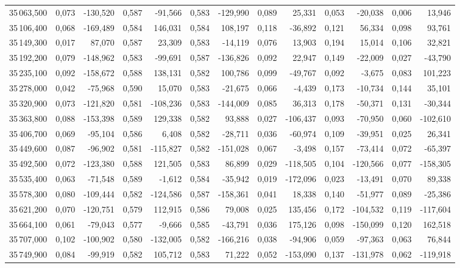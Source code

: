 \begin{longtable}{rrrrrrrrrrrrr}
35\,063,500 & 0,073 & -130,520 & 0,587 & -91,566 & 0,583 & -129,990 & 0,089 & 25,331 & 0,053 & -20,038 & 0,006 & 13,946\\
35\,106,400 & 0,068 & -169,489 & 0,584 & 146,031 & 0,584 & 108,197 & 0,118 & -36,892 & 0,121 & 56,334 & 0,098 & 93,761\\
35\,149,300 & 0,017 & 87,070 & 0,587 & 23,309 & 0,583 & -14,119 & 0,076 & 13,903 & 0,194 & 15,014 & 0,106 & 32,821\\
35\,192,200 & 0,079 & -148,962 & 0,583 & -99,691 & 0,587 & -136,826 & 0,092 & 22,947 & 0,149 & -22,009 & 0,027 & -43,790\\
35\,235,100 & 0,092 & -158,672 & 0,588 & 138,131 & 0,582 & 100,786 & 0,099 & -49,767 & 0,092 & -3,675 & 0,083 & 101,223\\
35\,278,000 & 0,042 & -75,968 & 0,590 & 15,070 & 0,583 & -21,675 & 0,066 & -4,439 & 0,173 & -10,734 & 0,144 & 35,101\\
35\,320,900 & 0,073 & -121,820 & 0,581 & -108,236 & 0,583 & -144,009 & 0,085 & 36,313 & 0,178 & -50,371 & 0,131 & -30,344\\
35\,363,800 & 0,088 & -153,398 & 0,589 & 129,338 & 0,582 & 93,888 & 0,027 & -106,437 & 0,093 & -70,950 & 0,060 & -102,610\\
35\,406,700 & 0,069 & -95,104 & 0,586 & 6,408 & 0,582 & -28,711 & 0,036 & -60,974 & 0,109 & -39,951 & 0,025 & 26,341\\
35\,449,600 & 0,087 & -96,902 & 0,581 & -115,827 & 0,582 & -151,028 & 0,067 & -3,498 & 0,157 & -73,414 & 0,072 & -65,397\\
35\,492,500 & 0,072 & -123,380 & 0,588 & 121,505 & 0,583 & 86,899 & 0,029 & -118,505 & 0,104 & -120,566 & 0,077 & -158,305\\
35\,535,400 & 0,063 & -71,548 & 0,589 & -1,612 & 0,584 & -35,942 & 0,019 & -172,096 & 0,023 & -13,491 & 0,070 & 89,338\\
35\,578,300 & 0,080 & -109,444 & 0,582 & -124,586 & 0,587 & -158,361 & 0,041 & 18,338 & 0,140 & -51,977 & 0,089 & -25,386\\
35\,621,200 & 0,070 & -120,751 & 0,579 & 112,915 & 0,586 & 79,008 & 0,025 & 135,456 & 0,172 & -104,532 & 0,119 & -117,604\\
35\,664,100 & 0,061 & -79,043 & 0,577 & -9,666 & 0,585 & -43,791 & 0,036 & 175,126 & 0,098 & -150,099 & 0,120 & 162,518\\
35\,707,000 & 0,102 & -100,902 & 0,580 & -132,005 & 0,582 & -166,216 & 0,038 & -94,906 & 0,059 & -97,363 & 0,063 & 76,844\\
35\,749,900 & 0,084 & -99,919 & 0,582 & 105,712 & 0,583 & 71,222 & 0,052 & -153,090 & 0,137 & -131,978 & 0,062 & -119,918\\

\end{longtable}
